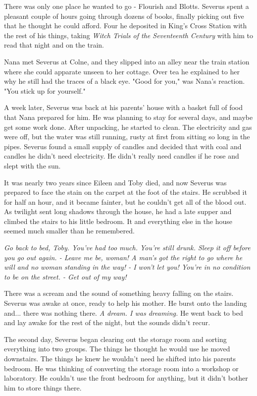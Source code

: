 \documentclass[a4paper,11pt]{article}
\begin{document}
There was only one place he wanted to go - Flourish and Blotts. Severus spent a pleasant couple of hours going through dozens of books, finally picking out five that he thought he could afford. Four he deposited in King's Cross Station with the rest of his things, taking \emph{Witch Trials of the Seventeenth Century} with him to read that night and on the train.

Nana met Severus at Colne, and they slipped into an alley near the train station where she could apparate unseen to her cottage. Over tea he explained to her why he still had the traces of a black eye. "Good for you," was Nana's reaction. "You stick up for yourself."

A week later, Severus was back at his parents' house with a basket full of food that Nana prepared for him. He was planning to stay for several days, and maybe get some work done. After unpacking, he started to clean. The electricity and gas were off, but the water was still running, rusty at first from sitting so long in the pipes. Severus found a small supply of candles and decided that with coal and candles he didn't need electricity. He didn't really need candles if he rose and slept with the sun.

It was nearly two years since Eileen and Toby died, and now Severus was prepared to face the stain on the carpet at the foot of the stairs. He scrubbed it for half an hour, and it became fainter, but he couldn't get all of the blood out. As twilight sent long shadows through the house, he had a late supper and climbed the stairs to his little bedroom. It and everything else in the house seemed much smaller than he remembered.

\emph{Go back to bed, Toby. You've had too much. You're still drunk. Sleep it off before you go out again. - Leave me be, woman! A man's got the right to go where he will and no woman standing in the way! - I won't let you! You're in no condition to be on the street. - Get out of my way!}

There was a scream and the sound of something heavy falling on the stairs. Severus was awake at once, ready to help his mother. He burst onto the landing and... there was nothing there. \emph{A dream. I was dreaming.} He went back to bed and lay awake for the rest of the night, but the sounds didn't recur.

The second day, Severus began clearing out the storage room and sorting everything into two groups. The things he thought he would use he moved downstairs. The things he knew he wouldn't need he shifted into his parents bedroom. He was thinking of converting the storage room into a workshop or laboratory. He couldn't use the front bedroom for anything, but it didn't bother him to store things there.
\end{document}
